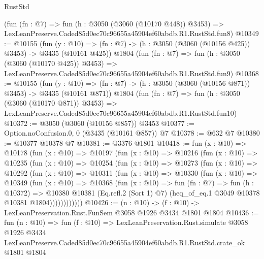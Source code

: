 \begin{lexlean}{RustStd}
\begin{coremodule}
    (fun (fn : @7) =>
    fun (h : @3050 (@3060 (@10170 @448)) @3453) =>
    LexLeanPreserve.Caded85d0ec70c96655a45904ef60abdb.R1.RustStd.fun8)
@10349 := @10155
    (fun (y : @10) => (fn : @7) -> (h : @3050 (@3060 (@10156 @425)) @3453) -> @3435 (@10161 @425))
    @1804
    (fun (fn : @7) =>
    fun (h : @3050 (@3060 (@10170 @425)) @3453) =>
    LexLeanPreserve.Caded85d0ec70c96655a45904ef60abdb.R1.RustStd.fun9)
@10368 := @10155
    (fun (y : @10) => (fn : @7) -> (h : @3050 (@3060 (@10156 @871)) @3453) -> @3435 (@10161 @871))
    @1804
    (fun (fn : @7) =>
    fun (h : @3050 (@3060 (@10170 @871)) @3453) =>
    LexLeanPreserve.Caded85d0ec70c96655a45904ef60abdb.R1.RustStd.fun10)
@10372 := @3050 (@3060 (@10156 @857)) @3453
@10377 := Option.noConfusion.{0, 0} (@3435 (@10161 @857)) @7
@10378 := @632 @7
@10380 := @10377 @10378 @7
@10381 := @3376 @1801
@10418 := fun (x : @10) =>
  @10178
    (fun (x : @10) =>
    @10197
      (fun (x : @10) =>
      @10216
        (fun (x : @10) =>
        @10235
          (fun (x : @10) =>
          @10254
            (fun (x : @10) =>
            @10273
              (fun (x : @10) =>
              @10292
                (fun (x : @10) =>
                @10311
                  (fun (x : @10) =>
                  @10330
                    (fun (x : @10) =>
                    @10349
                      (fun (x : @10) =>
                      @10368
                        (fun (x : @10) =>
                        fun (fn : @7) =>
                        fun (h : @10372) =>
                        @10380
                          @10381
                          (Eq.refl.{2} (Sort 1) @7)
                          (heq_of_eq.{1} @3049 @10378 @10381 @1804))))))))))))
@10426 := (n : @10) -> (f : @10) -> LexLeanPreservation.Rust.FunSem @3058 @1926 @3434 @1801 @1804
@10436 := fun (n : @10) =>
  fun (f : @10) =>
  LexLeanPreservation.Rust.simulate
    @3058
    @1926
    @3434
    LexLeanPreserve.Caded85d0ec70c96655a45904ef60abdb.R1.RustStd.crate_ok
    @1801
    @1804
\end{coremodule}
\end{lexlean}

